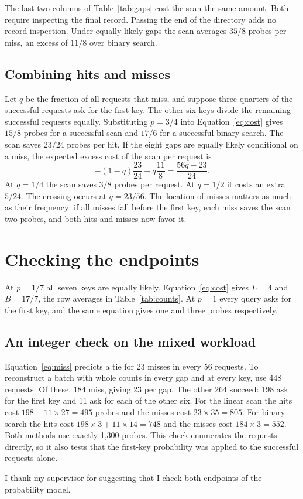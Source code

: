 \documentclass[lang=en]{fduthesis}
\begin{document}
The last two columns of Table~\ref{tab:gaps} cost the scan the same amount.
Both require inspecting the final record. Passing the end of the directory
adds no record inspection. Under equally likely gaps the scan averages
$35/8$ probes per miss, an excess of $11/8$ over binary search.

\section{Combining hits and misses}
Let $q$ be the fraction of all requests that miss, and suppose three quarters
of the successful requests ask for the first key. The other six keys divide
the remaining successful requests equally. Substituting $p=3/4$ into
Equation~\ref{eq:cost} gives $15/8$ probes for a successful scan and $17/6$
for a successful binary search. The scan saves $23/24$ probes per hit. If
the eight gaps are equally likely conditional on a miss, the expected excess
cost of the scan per request is
\begin{equation}
  -(1-q)\frac{23}{24}+q\frac{11}{8}=\frac{56q-23}{24}.
  \label{eq:miss}
\end{equation}
At $q=1/4$ the scan saves $3/8$ probes per request. At $q=1/2$ it costs
an extra $5/24$. The crossing occurs at $q=23/56$. The location of misses
matters as much as their frequency: if all misses fall before the first key,
each miss saves the scan two probes, and both hits and misses now favor it.

\printbibliography

\appendix
\chapter{Checking the endpoints}
At $p=1/7$ all seven keys are equally likely. Equation~\ref{eq:cost}
gives $L=4$ and $B=17/7$, the row averages in Table~\ref{tab:counts}.
At $p=1$ every query asks for the first key, and the same equation gives
one and three probes respectively.

\section{An integer check on the mixed workload}
Equation~\ref{eq:miss} predicts a tie for 23 misses in every 56 requests.
To reconstruct a batch with whole counts in every gap and at every key, use
448 requests. Of these, 184 miss, giving 23 per gap. The other 264 succeed:
198 ask for the first key and 11 ask for each of the other six.
For the linear scan the hits cost $198+11\times27=495$ probes and the
misses cost $23\times35=805$. For binary search the hits cost
$198\times3+11\times14=748$ and the misses cost $184\times3=552$.
Both methods use exactly 1,300 probes. This check enumerates the requests
directly, so it also tests that the first-key probability was applied to
the successful requests alone.

\backmatter

\begin{acknowledgements}
I thank my supervisor for suggesting that I check both endpoints of the
probability model.
\end{acknowledgements}
\makeauthorization
\end{document}
